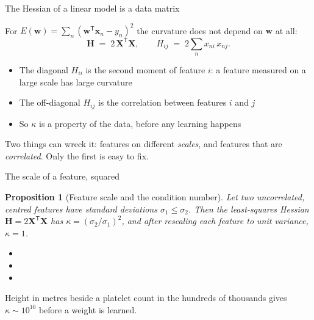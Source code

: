 \documentclass[aspectratio=169, 11pt]{beamer}
\newtheorem{propx}[theorem]{Proposition}
\newcommand{\src}[3]{}      %
\newcommand{\nosrc}{}       %
\begin{document}
\begin{frame}{The Hessian of a linear model is a data matrix}
  \nosrc
  \vspace{-0.25em}
  For $E(\mathbf{w}) = \sum_n (\mathbf{w}^{\mathsf T}\mathbf{x}_n - y_n)^2$ the curvature
  does not depend on $\mathbf{w}$ at all:
  \vspace{-0.35em}
  \[
    \mathbf{H} \;=\; 2\, \mathbf{X}^{\mathsf T} \mathbf{X} ,
    \qquad
    H_{ij} \;=\; 2 \sum_n x_{ni}\, x_{nj} .
  \]
  \vspace{-0.6em}
  \begin{itemize}\itemsep0.35em
    \item The diagonal $H_{ii}$ is the second moment of feature $i$: a
          feature measured on a large scale has large curvature
    \item The off-diagonal $H_{ij}$ is the correlation between features
          $i$ and $j$
    \item So $\kappa$ is a property of the \alert{data}, before any
          learning happens
  \end{itemize}
  \begin{redhighlight}
    Two things can wreck it: features on different \emph{scales}, and
    features that are \emph{correlated}. Only the first is easy to fix.
  \end{redhighlight}
\end{frame}

\begin{frame}{The scale of a feature, squared}
  \src{bishop2024}{section}{7.4.1}
  \vspace{-0.25em}
  \begin{propx}[Feature scale and the condition number]\label{th:scale}
    \small
    Let two uncorrelated, centred features have standard deviations
    $\sigma_1 \leq \sigma_2$. Then the least-squares Hessian
    $\mathbf{H} = 2\mathbf{X}^{\mathsf T}\mathbf{X}$ has
    $\kappa = (\sigma_2/\sigma_1)^{2}$, and after rescaling each feature
    to unit variance, $\kappa = 1$.
  \end{propx}
  \vspace{0.05em}
  {\footnotesize
  \begin{itemize}\itemsep0.26em
    \item {}
    \item {}
    \item {}
  \end{itemize}}
  \vspace{-0.35em}
  \begin{redhighlight}
    Height in metres beside a platelet count in the hundreds of
    thousands gives $\kappa \sim 10^{10}$ before a weight is learned.
  \end{redhighlight}
\end{frame}
\end{document}
